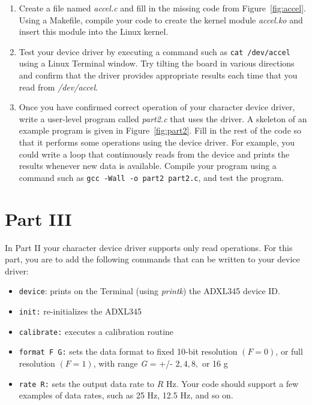 \documentclass[epsfig,10pt,fullpage]{article}
\begin{document}
\begin{enumerate}
\item Create a file named {\it accel.c} and fill in the missing code from Figure~\ref{fig:accel}.
Using a Makefile, compile your code to create the 
kernel module {\it accel.ko} and insert this module into the Linux kernel. 
\item Test your device driver by executing a command such as \texttt{cat /dev/accel} using a
Linux Terminal window. Try tilting the board in various directions and confirm that the
driver provides appropriate results each time that you read from {\it /dev/accel}.
\item
Once you have confirmed correct operation of your character device driver, write a user-level
program called {\it part2.c} that uses the driver.
A skeleton of an example program is given in Figure~\ref{fig:part2}. Fill in the rest 
of the code so that it performs some operations using the device driver. For example, you could 
write a loop that continuously reads from the device and prints the results whenever new
data is available. Compile your program using a command such as \texttt{gcc -Wall -o part2
part2.c}, and test the program.
\end{enumerate}

\noindent
\section*{Part III}

In Part II your character device driver supports only read operations. For this part, you
are to add the following commands that can be written to your device driver:

\begin{itemize}
		  \item \texttt{device}: prints on the Terminal (using {\it printk}) the ADXL345 device ID.
		  \item \texttt{init:} re-initializes the ADXL345
		  \item \texttt{calibrate:} executes a calibration routine
		  \item \texttt{format F G:} sets the data format to fixed 10-bit resolution $(F = 0)$, or
					 full resolution $(F = 1)$, with range {\it G} = +/- $2, 4, 8,$ or 16 g
		  \item \texttt{rate R:} sets the output data rate to $R$ Hz. Your code should support
					 a few examples of data rates, such as 25 Hz, 12.5 Hz, and so on.
\end{itemize}
\end{document}
